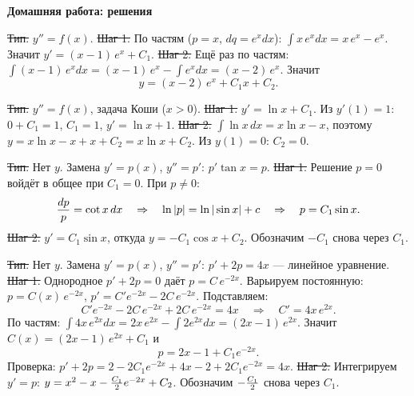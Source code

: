 \bigskip

\bigskip

\bigskip

\bigskip

\bigskip

\bigskip


\vfil\eject

\centerline{\bf Домашняя работа: решения}
\bigskip

\st{Тип.} $y''=f(x)$.
\st{Шаг 1.} По частям ($p=x$, $dq=e^xdx$):
$\int x\,e^xdx=x\,e^x-e^x$. Значит $y'=(x-1)\,e^x+C_1$.
\st{Шаг 2.} Ещё раз по частям:
$\int(x-1)\,e^xdx=(x-1)\,e^x-\int e^xdx=(x-2)\,e^x$. Значит
$$y=(x-2)\,e^x+C_1x+C_2.$$

\st{Тип.} $y''=f(x)$, задача Коши ($x>0$).
\st{Шаг 1.} $y'=\ln x+C_1$. Из $y'(1)=1$: $0+C_1=1$, $C_1=1$,
$y'=\ln x+1$.
\st{Шаг 2.} $\int\ln x\,dx=x\ln x-x$, поэтому
$y=x\ln x-x+x+C_2=x\ln x+C_2$. Из $y(1)=0$: $C_2=0$.

\st{Тип.} Нет $y$. Замена $y'=p(x)$, $y''=p'$: $p'\tan x=p$.
\st{Шаг 1.} Решение $p=0$ войдёт в общее при $C_1=0$. При $p\ne0$:
$${dp\over p}=\cot x\,dx\quad\Rightarrow\quad\ln|p|=\ln|\sin x|+c
\quad\Rightarrow\quad p=C_1\sin x.$$
\st{Шаг 2.} $y'=C_1\sin x$, откуда $y=-C_1\cos x+C_2$. Обозначим
$-C_1$ снова через $C_1$.

\st{Тип.} Нет $y$. Замена $y'=p(x)$, $y''=p'$: $p'+2p=4x$ --- линейное
уравнение.
\st{Шаг 1.} Однородное $p'+2p=0$ даёт $p=C\,e^{-2x}$. Варьируем
постоянную: $p=C(x)\,e^{-2x}$, $p'=C'e^{-2x}-2C\,e^{-2x}$. Подставляем:
$$C'e^{-2x}-2C\,e^{-2x}+2C\,e^{-2x}=4x\quad\Rightarrow\quad C'=4x\,e^{2x}.$$
По частям: $\int4x\,e^{2x}dx=2x\,e^{2x}-\int2e^{2x}dx=(2x-1)\,e^{2x}$. Значит
$C(x)=(2x-1)\,e^{2x}+C_1$ и
$$p=2x-1+C_1e^{-2x}.$$
Проверка: $p'+2p=2-2C_1e^{-2x}+4x-2+2C_1e^{-2x}=4x$.
\st{Шаг 2.} Интегрируем $y'=p$:
$y=x^2-x-{C_1\over2}e^{-2x}+C_2$. Обозначим $-{C_1\over2}$ снова через $C_1$.

